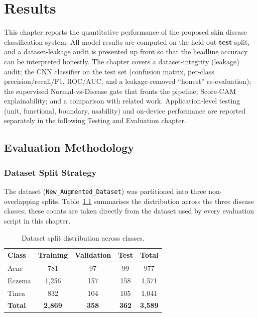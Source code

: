 \chapter{Results}

This chapter reports the quantitative performance of the proposed skin disease
classification system. All model results are computed on the held-out
\textbf{test} split, and a dataset-leakage audit is presented up front so that
the headline accuracy can be interpreted honestly. The chapter covers a
dataset-integrity (leakage) audit; the CNN classifier on the test set
(confusion matrix, per-class precision/recall/F1, ROC/AUC, and a
leakage-removed ``honest'' re-evaluation); the supervised Normal-vs-Disease gate
that fronts the pipeline; Score-CAM explainability; and a comparison with
related work. Application-level testing (unit, functional, boundary, usability)
and on-device performance are reported separately in the following
Testing and Evaluation chapter.

\section{Evaluation Methodology}

\subsection{Dataset Split Strategy}

The dataset (\texttt{New\_Augmented\_Dataset}) was partitioned into three
non-overlapping splits. Table~\ref{tab:dataset_splits} summarises the
distribution across the three disease classes; these counts are taken directly
from the dataset used by every evaluation script in this chapter.

\begin{table}[H]
\centering
\caption{Dataset split distribution across classes.}
\label{tab:dataset_splits}
\begin{tabular}{|l|c|c|c|c|}
\hline
\textbf{Class} & \textbf{Training} & \textbf{Validation} & \textbf{Test} & \textbf{Total} \\ \hline
Acne   &   781 &  97 &  99 &   977 \\ \hline
Eczema & 1{,}256 & 157 & 158 & 1{,}571 \\ \hline
Tinea  &   832 & 104 & 105 & 1{,}041 \\ \hline
\textbf{Total} & \textbf{2{,}869} & \textbf{358} & \textbf{362} & \textbf{3{,}589} \\ \hline
\end{tabular}
\end{table}

